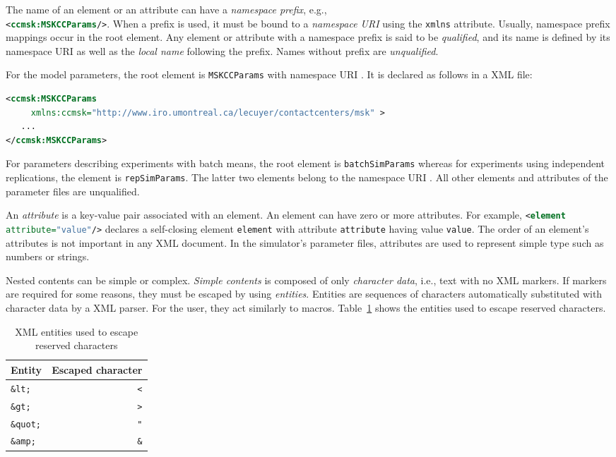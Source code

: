 The name of an
element or an attribute can have a \emph{namespace prefix}, e.g.,\\
\lstinline[language=XML]{<ccmsk:MSKCCParams/>}.
When a prefix is used, it must be bound to a \emph{namespace URI}
using the \texttt{xmlns} attribute.
Usually, namespace prefix mappings occur in the root element.
Any element or attribute with a namespace prefix is said to be
\emph{qualified}, and its name is defined by its namespace URI as well
as the \emph{local name} following the prefix.
Names without prefix are \emph{unqualified}.

For the model parameters, the root element is \texttt{MSKCCParams}
with namespace URI
.
It is declared as follows in a XML file:
\begin{lstlisting}[language=XML,frame={}]
<ccmsk:MSKCCParams
     xmlns:ccmsk="http://www.iro.umontreal.ca/lecuyer/contactcenters/msk" >
   ...
</ccmsk:MSKCCParams>
\end{lstlisting}
For parameters describing experiments with batch means, the root
element is
\texttt{batch\-Sim\-Params} whereas for experiments
using independent replications, the element is
\texttt{rep\-Sim\-Params}.
The latter two elements belong to the namespace URI
.
All other elements and attributes of the parameter files are
unqualified.

An \emph{attribute} is a key-value pair associated with an element.
An element can have zero or more attributes.  For example,
\lstinline[language=XML]{<element attribute="value"/>} declares a
self-closing element
\texttt{element} with attribute \texttt{attribute} having value
\texttt{value}.  The order of an element's attributes is not important
in any XML document.
In the simulator's parameter files, attributes are used to represent
simple type such as numbers or strings.

Nested contents can be simple or complex.  \emph{Simple contents} is
composed of only \emph{character data}, i.e., text with no XML
markers.  If markers are required for some reasons, they must
be escaped by using \emph{entities}.  Entities are sequences of
characters automatically substituted with character data
by a XML parser.  For the user, they act similarly to macros.
Table~\ref{tab:entities} shows the entities
used to escape reserved characters.

\begin{table}
\caption{XML entities used to escape reserved characters}
\label{tab:entities}
  \centering
  \begin{tabular}{|lr|}
    \hline
    Entity&Escaped character\\\hline
    \texttt{\&lt;}&\verb!<!\\
    \texttt{\&gt;}&\verb!>!\\
    \texttt{\&quot;}&\texttt{"}\\
    \texttt{\&amp;}&\texttt{\&}\\\hline
  \end{tabular}
\end{table}

